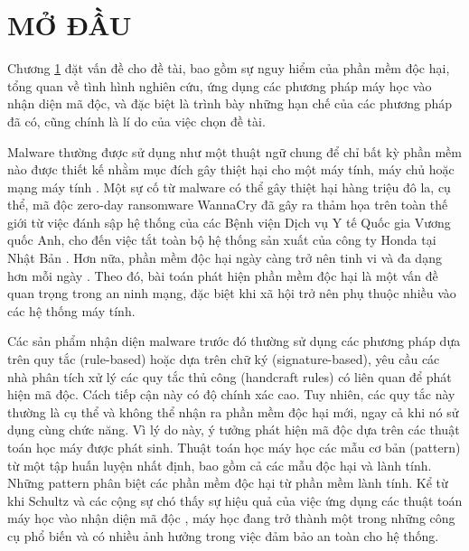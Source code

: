 
\chapter{MỞ ĐẦU}
\label{chap:problem-statement}
\graphicspath{{Chapter1/Figs/}}

\begin{chapabstract}
{Chương \ref{chap:problem-statement} đặt vấn đề cho đề tài, bao gồm sự nguy hiểm của phần mềm độc hại, tổng quan về tình hình nghiên cứu, ứng dụng các phương pháp máy học vào nhận diện mã độc, và đặc biệt là trình bày những hạn chế của các phương pháp đã có, cũng chính là lí do của việc chọn đề tài.}
\end{chapabstract}
Malware thường được sử dụng như một thuật ngữ chung để chỉ bất kỳ phần mềm nào được thiết kế nhằm mục đích gây thiệt hại cho một máy tính, máy chủ hoặc mạng máy tính \cite{moir2003defining}. 
Một sự cố từ malware có thể gây thiệt hại hàng triệu đô la, cụ thể, mã độc zero-day ransomware WannaCry đã gây ra thảm họa trên toàn thế giới từ việc đánh sập hệ thống của các Bệnh viện Dịch vụ Y tế Quốc gia Vương quốc Anh, cho đến việc tắt toàn bộ hệ thống sản xuất của công ty Honda tại Nhật Bản \cite{chen2017automated}.
Hơn nữa, phần mềm độc hại ngày càng trở nên tinh vi và đa dạng hơn mỗi ngày \cite{shahi2009technology}. Theo đó, bài toán phát hiện phần mềm độc hại là một vấn đề quan trọng trong an ninh mạng, đặc biệt khi xã hội trở nên phụ thuộc nhiều vào các hệ thống máy tính.

Các sản phẩm nhận diện malware trước đó thường sử dụng các phương pháp dựa trên quy tắc (rule-based) hoặc dựa trên chữ ký (signature-based), yêu cầu các nhà phân tích xử lý các quy tắc thủ công (handcraft rules) có liên quan để phát hiện mã độc.
Cách tiếp cận này có độ chính xác cao.
Tuy nhiên, các quy tắc này  thường là cụ thể và không thể nhận ra phần mềm độc hại mới, ngay cả khi nó sử dụng cùng chức năng.
Vì lý do này, ý tưởng phát hiện mã độc dựa trên các thuật toán học máy được phát sinh.
Thuật toán học máy học các mẫu cơ bản (pattern) từ một tập huấn luyện nhất định, bao gồm cả các mẫu độc hại và lành tính.
Những pattern phân biệt các phần mềm độc hại từ phần mềm lành tính.
Kể từ khi Schultz và các cộng sự chó thấy sự hiệu quả của việc ứng dụng các thuật toán máy học vào nhận diện mã độc \cite{schultz2001data}, máy học đang trở thành một trong những công cụ phổ biến và có nhiều ảnh hưởng trong việc đảm bảo an toàn cho hệ thống.

